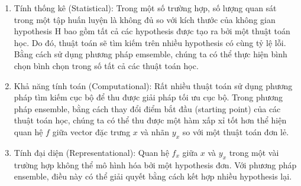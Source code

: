 \begin{enumerate}[label=(\alph*)]
\item Tính thống kê (Statistical): Trong một số trường hợp, số lượng quan sát trong một tập huấn luyện là không đủ so với kích thước của không gian hypothesis H bao gồm tất cả các hypothesis được tạo ra bởi một thuật toán học. Do đó, thuật toán sẽ tìm kiếm trên nhiều hypothesis có cùng tỷ lệ lỗi. Bằng cách sử dụng phương pháp emsemble, chúng ta có thể thực hiện bình chọn bình chọn trong số tất cả các thuật toán học. 
\item Khả năng tính toán (Computational): Rất nhiều thuật toán sử dụng phương pháp tìm kiếm cục bộ để thu được giải pháp tối ưu cục bộ. Trong phương pháp ensemble, bằng cách thay đổi điểm bắt đầu (starting point) của các thuật toán học, chúng ta có thể thu được một hàm xấp xỉ tốt hơn thể hiện quan hệ  $f$ giữa vector đặc trưng \textbf{$x$} và nhãn \textbf{$y_x$} so với một thuật toán đơn lẻ. 
\item Tính đại diện (Representational): Quan hệ $f_x$ giữa \textbf{$x$} và  \textbf{$y_x$} trong một vài trường hợp không thể mô hình hóa bởi một hypothesis đơn. Với phương pháp ensemble, điều này có thể giải quyết bằng cách kết hợp nhiều hypothesis lại. 
\end{enumerate}
